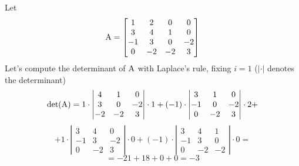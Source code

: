 \begin{example}
    \renewcommand*{\arraystretch}{1.5}
    Let
    $$
        \mathrm{A} = \left[\begin{matrix}
        1 & 2 & 0 & 0 \\
        3 & 4 & 1 & 0 \\
        -1 & 3 & 0 & -2 \\
        0 & -2 & -2 & 3
        \end{matrix}\right]
    $$
    Let's compute the determinant of $\mathrm{A}$ with Laplace's rule, fixing $i = 1$ ($|\cdot|$ denotes the determinant)
    $$
        \mathrm{det}{(\mathrm{A})} = 1 \cdot \left\vert\begin{matrix}4 & 1 & 0 \\ 3 & 0 & -2 \\ -2 & -2 & 3\end{matrix}\right\vert \cdot 1 + (-1) \cdot \left\vert\begin{matrix}3 & 1 & 0 \\ -1 & 0 & -2 \\ 0 & -2 & 3\end{matrix}\right\vert \cdot 2 +
    $$
    $$
        + 1 \cdot \left\vert\begin{matrix}3 & 4 & 0 \\ -1 & 3 & -2 \\ 0 & -2 & 3\end{matrix}\right\vert \cdot 0 + (-1) \cdot \left\vert\begin{matrix}3 & 4 & 1 \\ -1 & 3 & 0 \\ 0 & -2 & -2\end{matrix}\right\vert \cdot 0 =
    $$
    $$ = -21 + 18 + 0 + 0 = -3 $$
\end{example}